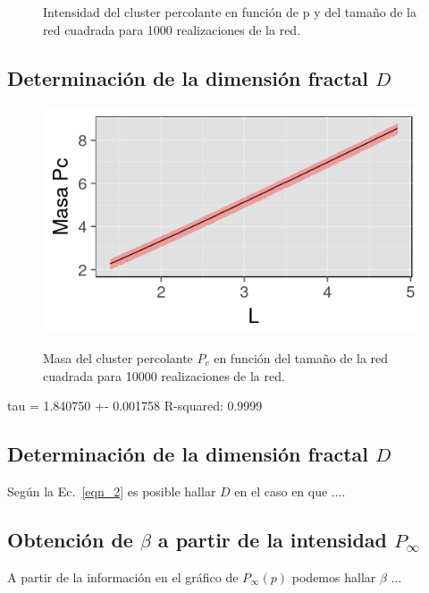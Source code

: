 \documentclass[%
 reprint,
 amsmath,amssymb,
 aps,
spanish]{revtex4-1}
\begin{document}
\begin{figure}[h]
\begin{subfigure}{.25\textwidth}
  \label{fig:2128x128}
\end{subfigure}
\caption{Intensidad del cluster percolante en función de p y del tamaño de la red cuadrada para 1000 realizaciones de la red.}
\label{fig:2}
\end{figure}

\subsection{\label{3} Determinaci\'on de la dimensi\'on fractal $D$ }

\begin{figure}[h]
  \centering
  \includegraphics[width=.9\linewidth]{ej3/masa}
  \label{fig:2masa}
\caption{Masa del cluster percolante $P_c$ en función del tamaño de la red cuadrada para 10000 realizaciones de la red.}
\label{fig:3}
\end{figure}

tau = 1.840750 +-  0.001758
R-squared:  0.9999

\subsection{\label{D} Determinaci\'on de la dimensi\'on fractal $D$ }

Seg\'un la Ec.~\ref{eqn_2} es posible hallar $D$ en el caso en que ....

\subsection{\label{P} Obtenci\'on de $\beta$ a partir de la intensidad $P_\infty$}

A partir de la informaci\'on en el gr\'afico de $P_\infty(p)$ podemos hallar $\beta$ ...
\end{document}
